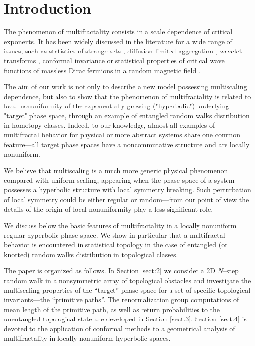 \section{Introduction} \label{sect:1} 
The phenomenon of multifractality consists in a scale dependence of critical
exponents. It has been widely discussed in the literature for a wide range of issues, such as statistics of strange sets \cite{procacc},
diffusion limited aggregation \cite{dla}, wavelet transforms \cite{holsch},
conformal invariance \cite{dupl} or  statistical properties of critical wave
functions of massless Dirac fermions in a random magnetic field
\cite{kogan,chamon,castillo}.

The aim of our work is not only to describe a new model
possessing multiscaling dependence, but also to show that the phenomenon of multifractality is related to local nonuniformity of the exponentially growing ("hyperbolic") underlying
"target" phase space, through an example of entangled random walks distribution in homotopy classes. Indeed, to our knowledge, almost  all examples of multifractal
behavior for physical \cite{kogan,chamon,castillo} or more abstract
\cite{procacc,derrida} systems share one common feature---all target phase
spaces have a noncommutative structure and are locally nonuniform.

We believe that multiscaling is a much more generic physical phenomenon
compared with uniform scaling, appearing when the phase space of a
system possesses a hyperbolic structure with local symmetry breaking. Such
perturbation of local symmetry could be either regular or random---from our point of view the
details of the origin of local nonuniformity play a less significant role.

We discuss below the basic features of multifractality in a locally
nonuniform regular hyperbolic phase space. We show in particular  that a
multifractal behavior is encountered in statistical topology in the case of entangled (or knotted) random walks distribution in topological classes.

The paper is organized as follows. In Section \ref{sect:2} we consider a 2D
$N$--step random walk in a nonsymmetric array of topological obstacles and investigate
the multiscaling properties of the ``target'' phase space for a set of
specific topological invariants---the ``primitive paths''. The renormalization
group computations of mean length of the primitive path, as well as   return
probabilities to the unentangled topological state are developed in Section \ref{sect:3}. Section \ref{sect:4} is devoted to the application of conformal methods to a  geometrical analysis of multifractality in  locally nonuniform
hyperbolic spaces.

